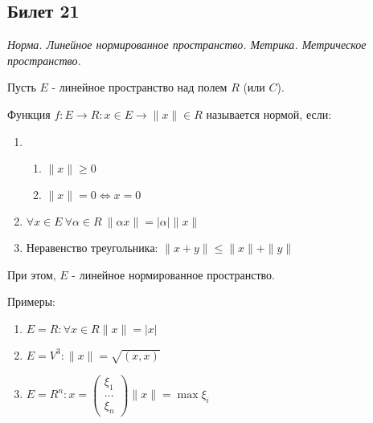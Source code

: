 \subsection{Билет 21}

\textit{Норма. Линейное нормированное пространство. Метрика. Метрическое пространство.}

Пусть $E$ - линейное пространство над полем $R$ (или $C$). 

Функция $f:E\to R: x \in E \to \| x \| \in R$ называется нормой, если:
\begin{enumerate}
 \item \begin{enumerate}
        \item $\|x\| \ge 0$
        \item $\|x\| = 0 \Leftrightarrow x = 0$
       \end{enumerate}
 \item $\forall x \in E ~ \forall \alpha \in R ~ \|\alpha x \| = \left| \alpha \right| \|x\|$
 \item Неравенство треугольника: $\|x+y\| \le \|x\| + \|y\|$
\end{enumerate}

При этом, $E$ - линейное нормированное пространство.

Примеры:

\begin{enumerate}
 \item $E = R: \forall x \in R \|x\| = \left| x \right|$
 \item $E = V^3: \|x\| = \sqrt{(x,x)}$
 \item $E = R^n: x = \left(\begin{matrix}
                            \mbox{$\xi_1$}\\
                            \mbox{...}\\
                            \mbox{$\xi_n$}
                           \end{matrix}\right) \|x\| = \max \xi_i$ 

\end{enumerate}

